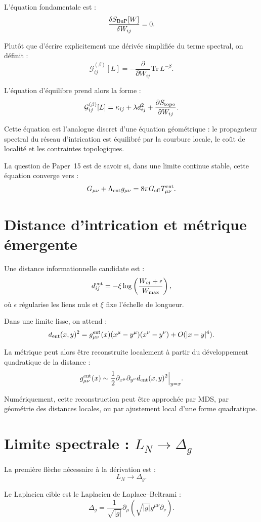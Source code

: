 \documentclass[11pt,a4paper]{article}
\begin{document}
L'équation fondamentale est :
\[
\frac{\delta S_{\rm BuP}[W]}{\delta W_{ij}}=0.
\]

Plutôt que d'écrire explicitement une dérivée simplifiée du terme spectral,
on définit :
\[
\mathcal{G}_{ij}^{(\beta)}[L]
=
-\frac{\partial}{\partial W_{ij}}
\mathrm{Tr}\,L^{-\beta}.
\]

L'équation d'équilibre prend alors la forme :
\[
\mathcal{G}_{ij}^{(\beta)}[L]
=
\kappa_{ij}
+
\lambda d_{ij}^{2}
+
\frac{\partial S_{\rm topo}}{\partial W_{ij}}.
\]

Cette équation est l'analogue discret d'une équation géométrique : le
propagateur spectral du réseau d'intrication est équilibré par la courbure
locale, le coût de localité et les contraintes topologiques.

La question de Paper~15 est de savoir si, dans une limite continue stable,
cette équation converge vers :
\[
G_{\mu\nu}
+
\Lambda_{\rm ent}g_{\mu\nu}
=
8\pi G_{\rm eff}T_{\mu\nu}^{\rm ent}.
\]

\section{Distance d'intrication et métrique émergente}

Une distance informationnelle candidate est :
\[
d_{ij}^{\rm ent}
=
-\xi\log\left(
\frac{W_{ij}+\epsilon}{W_{\max}}
\right),
\]
où \(\epsilon\) régularise les liens nuls et \(\xi\) fixe l'échelle de
longueur.

Dans une limite lisse, on attend :
\[
d_{\rm ent}(x,y)^2
=
g_{\mu\nu}^{\rm ent}(x)
(x^\mu-y^\mu)(x^\nu-y^\nu)
+
O(|x-y|^4).
\]

La métrique peut alors être reconstruite localement à partir du développement
quadratique de la distance :
\[
g_{\mu\nu}^{\rm ent}(x)
\sim
\frac{1}{2}
\partial_{x^\mu}\partial_{y^\nu}
d_{\rm ent}(x,y)^2
\Big|_{y=x}.
\]

Numériquement, cette reconstruction peut être approchée par MDS, par
géométrie des distances locales, ou par ajustement local d'une forme
quadratique.

\section{Limite spectrale : \(L_N\to\Delta_g\)}

La première flèche nécessaire à la dérivation est :
\[
L_N\longrightarrow \Delta_g.
\]

Le Laplacien cible est le Laplacien de Laplace--Beltrami :
\[
\Delta_g
=
\frac{1}{\sqrt{|g|}}
\partial_\mu
\left(
\sqrt{|g|}g^{\mu\nu}\partial_\nu
\right).
\]
\end{document}
